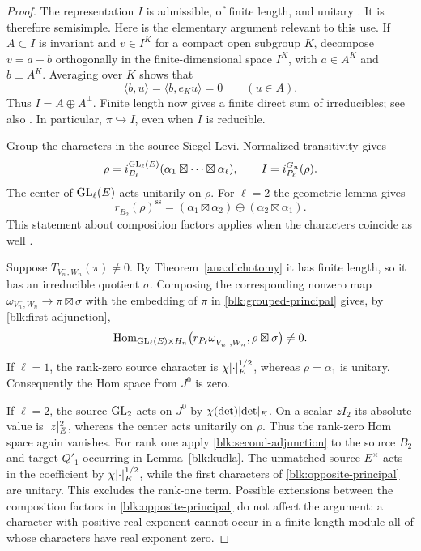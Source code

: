 \begin{proof}
The representation $I$ is admissible, of finite length, and unitary
\cite[Proposition~2.3 and Theorem~2.8]{BZ77}
\cite[Proposition~3.1.4]{Casselman}.  It is therefore semisimple.
Here is the elementary argument relevant to this use.  If $A\subset I$
is invariant and $v\in I^K$ for a compact open subgroup $K$, decompose
$v=a+b$ orthogonally in the finite-dimensional space $I^K$, with
$a\in A^K$ and $b\perp A^K$.  Averaging over $K$ shows that
\[
 \langle b,u\rangle=\langle b,e_Ku\rangle=0
       \qquad(u\in A).
\]
Thus $I=A\oplus A^\perp$.  Finite length now gives a finite direct sum
of irreducibles; see also
\cite[Propositions~2.1.5 and~2.1.14]{Casselman}.  In particular,
$\pi\hookrightarrow I$, even when $I$ is reducible.

Group the characters in the source Siegel Levi.  Normalized
transitivity gives
\begin{equation}
 \rho=i_{B_\ell}^{\operatorname{GL}_\ell(E)}
       (\alpha_1\boxtimes\cdots\boxtimes\alpha_\ell),
 \qquad I=i_{P_\ell}^{G_n}(\rho).
 \label{blk:grouped-principal}
\end{equation}
The center of $\operatorname{GL}_\ell(E)$ acts unitarily on $\rho$.  For $\ell=2$
the geometric lemma gives
\begin{equation}
 r_{\overline B_2}(\rho)^{\mathrm{ss}}
  =(\alpha_1\boxtimes\alpha_2)
       \oplus(\alpha_2\boxtimes\alpha_1).
 \label{blk:opposite-principal}
\end{equation}
This statement about composition factors applies when the characters
coincide as well \cite[Lemma~2.12]{BZ77}.

Suppose $T_{V_n^-,W_n}(\pi)\ne0$.  By
Theorem~\ref{ana:dichotomy} it has finite length, so it has an
irreducible quotient $\sigma$. Composing the corresponding nonzero
map $\omega_{V_n^-,W_n}\to\pi\boxtimes\sigma$ with the embedding
of $\pi$ in \eqref{blk:grouped-principal} gives, by
\eqref{blk:first-adjunction},
\begin{equation}
 \operatorname{Hom}_{\operatorname{GL}_\ell(E)\times H_n}
   \bigl(r_{P_\ell}\omega_{V_n^-,W_n},
               \rho\boxtimes\sigma\bigr)\ne0.
 \label{blk:principal-hom}
\end{equation}

If $\ell=1$, the rank-zero source character is
$\chi\lvert\cdot\rvert_E^{1/2}$, whereas $\rho=\alpha_1$ is unitary.
Consequently the Hom space from $J^0$ is zero.

If $\ell=2$, the source $\operatorname{GL}_2$ acts on $J^0$ by
$\chi(\det)\lvert\det\rvert_E$.  On a scalar $zI_2$ its absolute value is
$\lvert z\rvert_E^2$, whereas the center acts unitarily on $\rho$.
Thus the rank-zero Hom space again vanishes.  For rank one apply
\eqref{blk:second-adjunction} to the source $B_2$ and target $Q'_1$
occurring in Lemma~\ref{blk:kudla}.  The unmatched source $E^\times$
acts in the coefficient by $\chi\lvert\cdot\rvert_E^{1/2}$, while the first
characters of \eqref{blk:opposite-principal} are unitary.  This excludes
the rank-one term.  Possible extensions between the composition factors
in \eqref{blk:opposite-principal} do not affect the argument: a character
with positive real exponent cannot occur in a finite-length module all
of whose characters have real exponent zero.


\end{proof}
